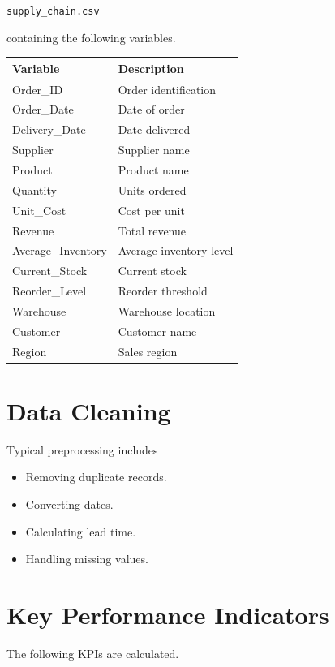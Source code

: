 \documentclass[11pt,a4paper]{article}
\begin{document}
\begin{center}
\texttt{supply\_chain.csv}
\end{center}

containing the following variables.

\begin{table}[h]
\centering
\begin{tabular}{ll}
\toprule
Variable & Description\\
\midrule
Order_ID & Order identification\\
Order_Date & Date of order\\
Delivery_Date & Date delivered\\
Supplier & Supplier name\\
Product & Product name\\
Quantity & Units ordered\\
Unit_Cost & Cost per unit\\
Revenue & Total revenue\\
Average_Inventory & Average inventory level\\
Current_Stock & Current stock\\
Reorder_Level & Reorder threshold\\
Warehouse & Warehouse location\\
Customer & Customer name\\
Region & Sales region\\
\bottomrule
\end{tabular}
\end{table}

\section{Data Cleaning}

Typical preprocessing includes

\begin{itemize}
\item Removing duplicate records.
\item Converting dates.
\item Calculating lead time.
\item Handling missing values.
\end{itemize}

\section{Key Performance Indicators}

The following KPIs are calculated.
\end{document}
